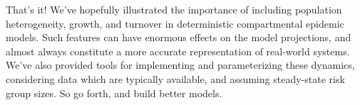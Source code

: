 That's it!
We've hopefully illustrated the importance of including
population heterogeneity, growth, and turnover
in deterministic compartmental epidemic models.
Such features can have enormous effects on
the model projections, and almost always constitute
a more accurate representation of real-world systems.
We've also provided tools for implementing and parameterizing these dynamics,
considering data which are typically available,
and assuming steady-state risk group sizes.
So go forth, and build better models.